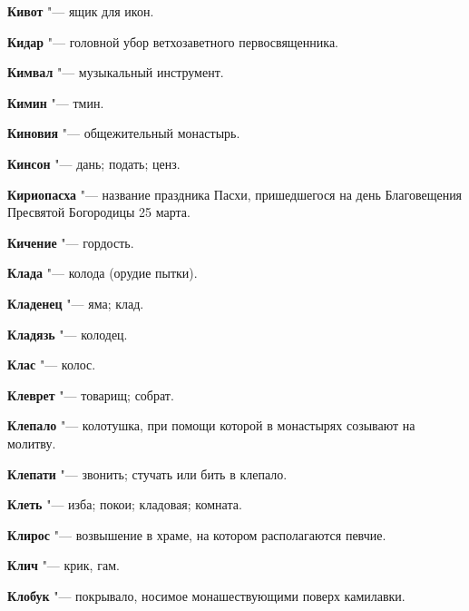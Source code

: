 \begin{mymulticols}{2}
\noindent\textbf{Кивот} "--- ящик для икон. 




\noindent\textbf{Кидар} "--- головной убор ветхозаветного первосвященника. 




\noindent\textbf{Кимвал} "--- музыкальный инструмент. 




\noindent\textbf{Кимин} "--- тмин. 




\noindent\textbf{Киновия} "--- общежительный монастырь. 




\noindent\textbf{Кинсон} "--- дань; подать; ценз. 




\noindent\textbf{Кириопасха} "--- название праздника Пасхи, пришедшегося на день Благовещения Пресвятой Богородицы 25 марта. 




\noindent\textbf{Кичение} "--- гордость. 




\noindent\textbf{Клада} "--- колода (орудие пытки). 




\noindent\textbf{Кладенец} "--- яма; клад. 




\noindent\textbf{Кладязь} "--- колодец. 




\noindent\textbf{Клас} "--- колос. 




\noindent\textbf{Клеврет} "--- товарищ; собрат. 




\noindent\textbf{Клепало} "--- колотушка, при помощи которой в монастырях созывают на молитву. 




\noindent\textbf{Клепати} "--- звонить; стучать или бить в клепало. 




\noindent\textbf{Клеть} "--- изба; покои; кладовая; комната. 




\noindent\textbf{Клирос} "--- возвышение в храме, на котором располагаются певчие. 




\noindent\textbf{Клич} "--- крик, гам. 




\noindent\textbf{Клобук} "--- покрывало, носимое монашествующими поверх камилавки. 





\end{mymulticols}

